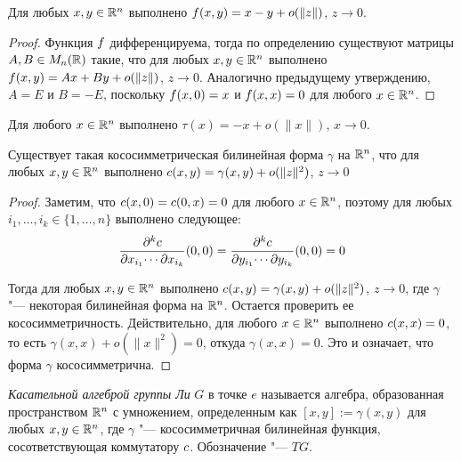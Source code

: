 \begin{proposition}
	Для любых $x, y \in \mathbb{R}^n$ выполнено $f(x, y) = x - y + o(\|z\|)$, $z \to 0$.
\end{proposition}

\begin{proof}
	Функция $f$ дифференцируема, тогда по определению существуют матрицы $A, B \in M_n(\mathbb{R})$ такие, что для любых $x, y \in \mathbb{R}^n$ выполнено $f(x, y) = Ax + By + o(\|z\|)$, $z \to 0$. Аналогично предыдущему утверждению, $A = E$ и $B = -E$, поскольку $f(x, 0) = x$ и $f(x, x) = 0$ для любого $x \in \mathbb{R}^n$.
\end{proof}

\begin{corollary}
	Для любого $x \in \mathbb{R}^n$ выполнено $\tau(x) = -x + o(\|x\|)$, $x \to 0$.
\end{corollary}

\begin{theorem}
	Существует такая кососимметрическая билинейная форма $\gamma$ на $\mathbb{R}^n$, что для любых $x, y \in \mathbb{R}^n$ выполнено $c(x, y) = \gamma(x, y) + o(\|z\|^2)$, $z \to 0$
\end{theorem}

\begin{proof}
	Заметим, что $c(x, 0) = c(0, x) = 0$ для любого $x \in \mathbb{R}^n$, поэтому для любых $i_1, \dotsc, i_k \in \{1, \dotsc, n\}$ выполнено следующее:
	\[\frac{\partial^k c}{\partial x_{i_1} \!\dotsb \partial x_{i_k}}(0, 0) = \frac{\partial^k c}{\partial y_{i_1} \!\dotsb \partial y_{i_k}}(0, 0) = 0\]
	
	Тогда для любых $x, y \in \mathbb{R}^n$ выполнено $c(x, y) = \gamma(x, y) + o(\|z\|^2)$, $z \to 0$, где $\gamma$ "--- некоторая билинейная форма на $\mathbb{R}^n$. Остается проверить ее кососимметричность. Действительно, для любого $x \in \mathbb{R}^n$ выполнено $c(x, x) = 0$, то есть $\gamma(x, x) + o(\|x\|^2) = 0$, откуда $\gamma(x, x) = 0$. Это и означает, что форма $\gamma$ кососимметрична.
\end{proof}

\begin{definition}
	\textit{Касательной алгеброй группы Ли} $G$ в точке $e$ называется алгебра, образованная пространством $\mathbb{R}^n$ с умножением, определенным как $[x, y] := \gamma(x, y)$ для любых $x, y \in \mathbb{R}^n$, где $\gamma$ "--- кососимметричная билинейная функция, сосответствующая коммутатору $c$. Обозначение "--- $T{G}$.
\end{definition}

